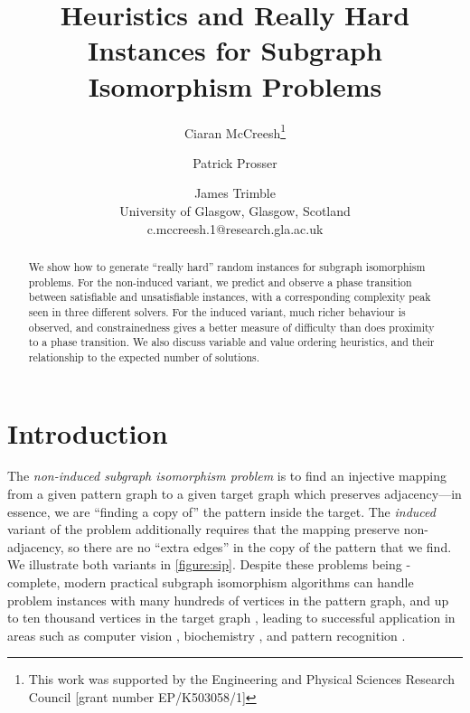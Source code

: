 \documentclass[letterpaper]{article}
\title{Heuristics and Really Hard Instances for Subgraph Isomorphism Problems}
\author{Ciaran McCreesh\thanks{This work was supported by the Engineering and Physical Sciences
    Research Council [grant number EP/K503058/1]} \and Patrick Prosser \and James Trimble \\
University of Glasgow, Glasgow, Scotland \\
c.mccreesh.1@research.gla.ac.uk}
\newcommand{\citep}[1]{\cite{#1}}
\begin{document}
\maketitle

\begin{abstract}
    We show how to generate ``really hard'' random instances for subgraph isomorphism problems. For
    the non-induced variant, we predict and observe a phase transition between satisfiable and
    unsatisfiable instances, with a corresponding complexity peak seen in three different solvers. For
    the induced variant, much richer behaviour is observed, and constrainedness gives
    a better measure of difficulty than does proximity to a phase transition. We also discuss variable
    and value ordering heuristics, and their relationship to the expected number of solutions.
\end{abstract}

\section{Introduction}

The \emph{non-induced subgraph isomorphism problem} is to find an injective mapping from a given
pattern graph to a given target graph which preserves adjacency---in essence, we are ``finding a
copy of'' the pattern inside the target. The \emph{induced} variant of the problem additionally
requires that the mapping preserve non-adjacency, so there are no ``extra edges'' in the copy of the
pattern that we find. We illustrate both variants in \cref{figure:sip}.
Despite these problems being \NP-complete, modern practical subgraph isomorphism algorithms can
handle problem instances with many hundreds of vertices in the pattern graph, and up to ten thousand
vertices in the target graph \citep{Cordella:2004,Solnon:2010,Audemard:2014,McCreesh:2015}, leading
to successful application in areas such as computer
vision \citep{Damiand:2011,Solnon:2015}, biochemistry \citep{Giugno:2013,Carletti:2015}, and pattern
recognition \citep{Conte:2004}.
\end{document}
